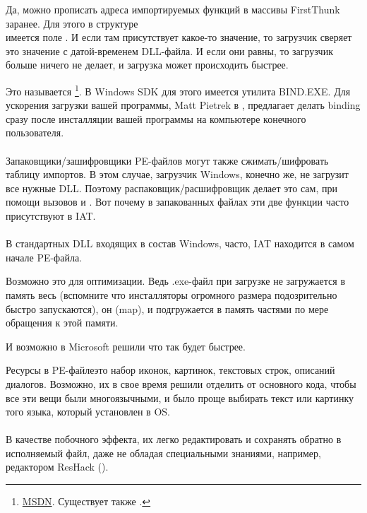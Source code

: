 Да, можно прописать адреса импортируемых функций в массивы FirstThunk заранее.
Для этого в структуре \\
 имеется поле .
И если там присутствует какое-то значение, то загрузчик сверяет это значение с датой-временем DLL-файла.
И если они равны, то загрузчик больше ничего не делает, и загрузка может происходить быстрее.

Это называется 
\footnote{\href{http://go.yurichev.com/17050}{MSDN}.
Существует также .}.
В Windows SDK для этого имеется утилита BIND.EXE.
Для ускорения загрузки вашей программы, 
Matt Pietrek в \PietrekPEURL, предлагает делать binding сразу после инсталляции
вашей программы на компьютере конечного пользователя. \\
\\
Запаковщики/зашифровщики PE-файлов могут также сжимать/шифровать таблицу импортов.
В этом случае, загрузчик Windows, конечно же, не загрузит все нужные DLL.
Поэтому распаковщик/расшифровщик делает это сам, при помощи вызовов  и .
Вот почему в запакованных файлах эти две функции часто присутствуют в \ac{IAT}. \\
\\
В стандартных DLL входящих в состав Windows, часто, \ac{IAT} находится в самом начале PE-файла.

Возможно это для оптимизации.
Ведь .exe-файл при загрузке не загружается в память весь 
(вспомните что инсталляторы огромного размера подозрительно быстро запускаются), он  (map), 
и подгружается в память частями по мере обращения к этой памяти.

И возможно в Microsoft решили что так будет быстрее.


\label{PEresources}
Ресурсы в PE-файле\EMDASH{}это набор иконок, картинок, текстовых строк, описаний диалогов.
Возможно, их в свое время решили отделить от основного кода, чтобы все эти вещи были многоязычными,
и было проще выбирать текст или картинку того языка, который установлен в \ac{OS}. \\
\\
В качестве побочного эффекта, их легко редактировать и сохранять обратно в исполняемый файл,
даже не обладая специальными знаниями, например, редактором ResHack ().

